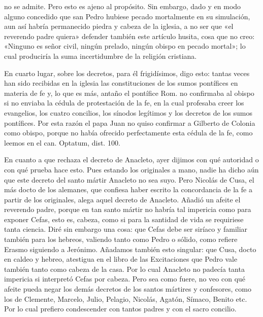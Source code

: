 no se admite. Pero esto es ajeno al propósito. Sin embargo, dado y en modo alguno concedido que san Pedro hubiese pecado mortalmente en su simulación, aun así habría permanecido piedra y cabeza de la iglesia, a no ser que «el reverendo padre quiera» defender también este artículo husita, cosa que no creo: «Ninguno es señor civil, ningún prelado, ningún obispo en pecado mortal»; lo cual produciría la suma incertidumbre de la religión cristiana.

En cuarto lugar, sobre los decretos, para él frigidísimos, digo esto: tantas veces han sido recibidas en la iglesia las constituciones de los sumos pontífices en materia de fe y, lo que es más, antaño el pontífice Rom. no confirmaba al obispo si no enviaba la cédula de protestación de la fe, en la cual profesaba creer los evangelios, los cuatro concilios, los sínodos legítimos y los decretos de los sumos pontífices. Por esta razón el papa Juan no quiso confirmar a Gilberto de Colonia como obispo, porque no había ofrecido perfectamente esta cédula de la fe, como leemos en el can. Optatum, dist. 100.

En cuanto a que rechaza el decreto de Anacleto, ayer dijimos con qué autoridad o con qué prueba hace esto. Pues estando los originales a mano, nadie ha dicho aún que este decreto del santo mártir Anacleto no sea suyo. Pero Nicolás de Cusa, el más docto de los alemanes, que confiesa haber escrito la concordancia de la fe a partir de los originales, alega aquel decreto de Anacleto. Añadió un afeite el reverendo padre, porque en tan santo mártir no habría tal impericia como para exponer Cefas, esto es, cabeza, como si para la santidad de vida se requiriese tanta ciencia. Diré sin embargo una cosa: que Cefas debe ser siríaco y familiar también para los hebreos, valiendo tanto como Pedro o sólido, como refiere Erasmo siguiendo a Jerónimo. Añadamos también esto singular: que Cusa, docto en caldeo y hebreo, atestigua en el libro de las Excitaciones que Pedro vale también tanto como cabeza de la casa. Por lo cual Anacleto no padecía tanta impericia si interpretó Cefas por cabeza. Pero sea como fuere, no veo con qué afeite pueda negar los demás decretos de los santos mártires y confesores, como los de Clemente, Marcelo, Julio, Pelagio, Nicolás, Agatón, Símaco, Benito etc. Por lo cual prefiero condescender con tantos padres y con el sacro concilio.

